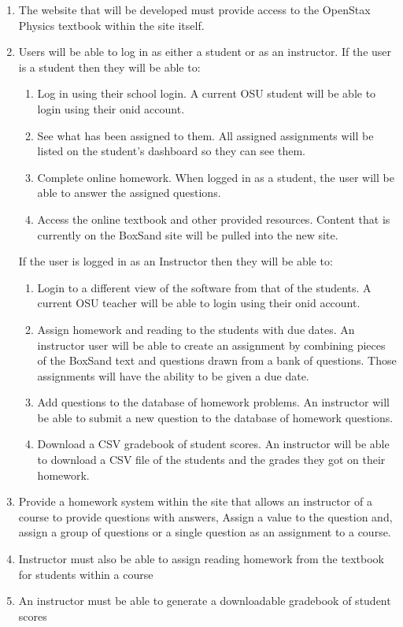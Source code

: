 \documentclass[onecolumn, draftclsnofoot,10pt, compsoc]{IEEEtran}
\begin{document}
\begin{enumerate}
\item The website that will be developed must provide access to the OpenStax Physics textbook within the site itself. 
\item Users will be able to log in as either a student or as an instructor. If the user is a student then they will be able to:
\begin{enumerate}
\item Log in using their school login. A current OSU student will be able to login using their onid account. 
\item See what has been assigned to them. All assigned assignments will be listed on the student's dashboard so they can see them.
\item Complete online homework. When logged in as a student, the user will be able to answer the assigned questions. 
\item Access the online textbook and other provided resources. Content that is currently on the BoxSand site will be pulled into the new site.
\end{enumerate}
If the user is logged in as an Instructor then they will be able to:
\begin{enumerate}
\item Login to a different view of the software from that of the students. A current OSU teacher will be able to login using their onid account.
\item Assign homework and reading to the students with due dates. An instructor user will be able to create an assignment by combining pieces of the BoxSand text and questions drawn from a bank of questions. Those assignments will have the ability to be given a due date.
\item Add questions to the database of homework problems. An instructor will be able to submit a new question to the database of homework questions.
\item Download a CSV gradebook of student scores. An instructor will be able to download a CSV file of the students and the grades they got on their homework.
\end{enumerate}
\item Provide a homework system within the site that allows an instructor of a course to provide questions with answers, Assign a value to the question and, assign a group of questions or a single question as an assignment to a course.
\item Instructor must also be able to assign reading homework from the textbook for students within a course
\item An instructor must be able to generate a downloadable gradebook of student scores
\end{enumerate}
\end{document}
